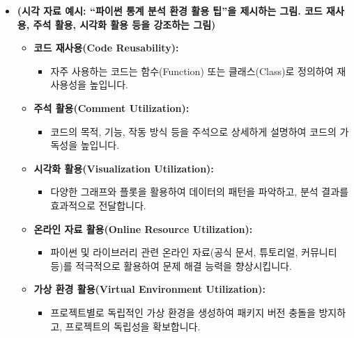 \documentclass[
  letterpaper,
]{book}
\providecommand{\tightlist}{%
  \setlength{\itemsep}{0pt}\setlength{\parskip}{0pt}}
\begin{document}
\begin{itemize}
\item
  \textbf{(시각 자료 예시: ``파이썬 통계 분석 환경 활용 팁''을 제시하는
  그림. 코드 재사용, 주석 활용, 시각화 활용 등을 강조하는 그림)}

  \begin{itemize}
  \tightlist
  \item
    \textbf{코드 재사용(Code Reusability):}

    \begin{itemize}
    \tightlist
    \item
      자주 사용하는 코드는 함수(Function) 또는 클래스(Class)로 정의하여
      재사용성을 높입니다.
    \end{itemize}
  \item
    \textbf{주석 활용(Comment Utilization):}

    \begin{itemize}
    \tightlist
    \item
      코드의 목적, 기능, 작동 방식 등을 주석으로 상세하게 설명하여
      코드의 가독성을 높입니다.
    \end{itemize}
  \item
    \textbf{시각화 활용(Visualization Utilization):}

    \begin{itemize}
    \tightlist
    \item
      다양한 그래프와 플롯을 활용하여 데이터의 패턴을 파악하고, 분석
      결과를 효과적으로 전달합니다.
    \end{itemize}
  \item
    \textbf{온라인 자료 활용(Online Resource Utilization):}

    \begin{itemize}
    \tightlist
    \item
      파이썬 및 라이브러리 관련 온라인 자료(공식 문서, 튜토리얼,
      커뮤니티 등)를 적극적으로 활용하여 문제 해결 능력을 향상시킵니다.
    \end{itemize}
  \item
    \textbf{가상 환경 활용(Virtual Environment Utilization):}

    \begin{itemize}
    \tightlist
    \item
      프로젝트별로 독립적인 가상 환경을 생성하여 패키지 버전 충돌을
      방지하고, 프로젝트의 독립성을 확보합니다.
    \end{itemize}
  \end{itemize}
\end{itemize}
\end{document}
